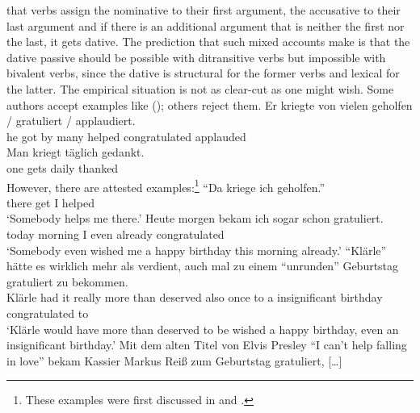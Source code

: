 that verbs assign the nominative to their first argument, the accusative to their last argument and
if there is an additional argument that is neither the first nor the last, it gets dative. The
prediction that such mixed accounts make is that the dative passive should be possible with
ditransitive verbs but impossible with bivalent verbs, since the dative is structural for the former
verbs and lexical for the latter. The empirical situation is not as clear-cut as one might
wish. Some authors accept examples like (); others reject them.
\eal
\label{ex-helfen-with-dative-passive}
\ex 
\gll Er kriegte von vielen geholfen / gratuliert / applaudiert.\\
     he got by many helped {} congratulated {} applauded\\
\ex 
\gll Man kriegt täglich gedankt.\\
     one gets   daily thanked\\
\zl
However, there are attested examples:\footnote{
  These examples were first discussed in  and .
}
\eal
\label{ex-helfen-with-dative-passive-corpus}
\ex "`Da kriege ich geholfen."'\footnotemark\\
     \quotespace{}there get  I  helped\\
\glt `Somebody helps me there.'
\ex
\gll Heute morgen bekam ich sogar schon gratuliert.\footnotemark\\
     today morning \AUX{}  I even already congratulated\\
\glt `Somebody even wished me a happy birthday this morning already.'
\ex
\gll "`Klärle"' hätte es wirklich mehr als verdient, auch mal zu einem "`unrunden"' Geburtstag gratuliert zu bekommen.\footnotemark\\
     \hphantom{"`}Klärle had it really more than deserved also once to a \hphantom{"`}insignificant birthday congratulated to \AUX\\
\glt `Klärle would have more than deserved to be wished a happy birthday, even an insignificant birthday.'
\ex 
\gll Mit dem alten Titel von Elvis Presley "`I can't help falling in love"' bekam Kassier Markus Reiß zum Geburtstag gratuliert, [\ldots]\footnotemark\\
